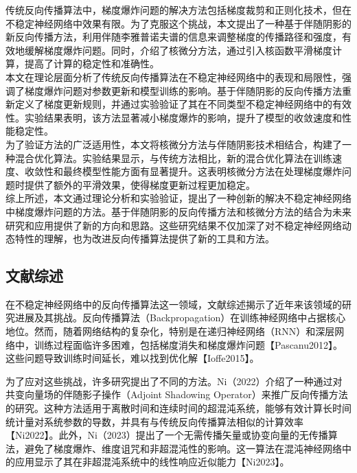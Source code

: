 \documentclass[12pt,a4paper]{amsart}
\begin{document}
传统反向传播算法中，梯度爆炸问题的解决方法包括梯度裁剪和正则化技术，但在不稳定神经网络中效果有限。为了克服这个挑战，本文提出了一种基于伴随阴影的新反向传播方法，利用伴随李雅普诺夫谱的信息来调整梯度的传播路径和强度，有效地缓解梯度爆炸问题。同时，介绍了核微分方法，通过引入核函数平滑梯度计算，提高了计算的稳定性和准确性。\\

本文在理论层面分析了传统反向传播算法在不稳定神经网络中的表现和局限性，强调了梯度爆炸问题对参数更新和模型训练的影响。基于伴随阴影的反向传播方法重新定义了梯度更新规则，并通过实验验证了其在不同类型不稳定神经网络中的有效性。实验结果表明，该方法显著减小梯度爆炸的影响，提升了模型的收敛速度和性能稳定性。\\

为了验证方法的广泛适用性，本文将核微分方法与伴随阴影技术相结合，构建了一种混合优化算法。实验结果显示，与传统方法相比，新的混合优化算法在训练速度、收敛性和最终模型性能方面有显著提升。这表明核微分方法在处理梯度爆炸问题时提供了额外的平滑效果，使得梯度更新过程更加稳定。\\

综上所述，本文通过理论分析和实验验证，提出了一种创新的解决不稳定神经网络中梯度爆炸问题的方法。基于伴随阴影的反向传播方法和核微分方法的结合为未来研究和应用提供了新的方向和思路。这些研究结果不仅加深了对不稳定神经网络动态特性的理解，也为改进反向传播算法提供了新的工具和方法。\\

\subsection{文献综述}

在不稳定神经网络中的反向传播算法这一领域，文献综述揭示了近年来该领域的研究进展及其挑战。反向传播算法（Backpropagation）在训练神经网络中占据核心地位。然而，随着网络结构的复杂化，特别是在递归神经网络（RNN）和深层网络中，训练过程面临许多困难，包括梯度消失和梯度爆炸问题【Pascanu2012】。这些问题导致训练时间延长，难以找到优化解【Ioffe2015】。

为了应对这些挑战，许多研究提出了不同的方法。Ni（2022）介绍了一种通过对共变向量场的伴随影子操作（Adjoint Shadowing Operator）来推广反向传播方法的研究。这种方法适用于离散时间和连续时间的超混沌系统，能够有效计算长时间统计量对系统参数的导数，并具有与传统反向传播算法相似的计算效率【Ni2022】。此外，Ni（2023）提出了一个无需传播矢量或协变向量的无传播算法，避免了梯度爆炸、维度诅咒和非超混沌性的影响。这一算法在混沌神经网络中的应用显示了其在非超混沌系统中的线性响应近似能力【Ni2023】。
\end{document}
